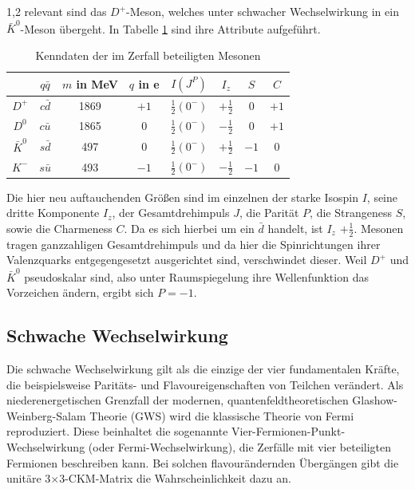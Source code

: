 \documentclass[11pt,a4paper,twoside]{report}
\begin{document}
\begin{spacing}{1,2}
relevant sind das $D^+$-Meson, welches unter schwacher Wechselwirkung in ein $\bar K^0$-Meson übergeht. In Tabelle \ref{tab_DKMeson} sind ihre Attribute
aufgeführt.
\begin{table}[H]
\begin{tabular}{c|ccc|cccc} \toprule 
  & $q\bar q$ &  $m$ in MeV & $q$ in e & $I(J^P)$ & $I_z$ & $S$ & $C$\\
 \midrule
  $D^+$ & $c\bar d$ & 1869 & $+1$ & $\frac12(0^-)$ & $+\frac12$ & 0 & $+1$\\
  $D^0$ & $c\bar u$ & 1865 & $0$  & $\frac12(0^-)$ & $-\frac12$ & 0 & $+1$\\
  $\bar K^0$ & $s\bar d$ & 497 & $0$ & $\frac12(0^-)$ & $+\frac12$ & $-1$& 0\\
  $K^-$ & $s\bar u $ & 493 & $-1$ & $\frac12(0^-)$ & $-\frac12$ & $-1$ & 0
\\\bottomrule \bottomrule
 \end{tabular}
\caption{Kenndaten der im Zerfall beteiligten Mesonen}
\label{tab_DKMeson}
\end{table}
\noindent
Die hier neu auftauchenden Größen sind im einzelnen der starke Isospin $I$, seine dritte Komponente $I_z$, der Gesamtdrehimpuls $J$, die Parität $P$, die
Strangeness $S$, sowie die Charmeness $C$. Da es sich hierbei um ein 
$\bar d$ handelt, ist $I_z$ $+\frac12$. Mesonen tragen ganzzahligen Gesamtdrehimpuls und da hier die Spinrichtungen ihrer Valenzquarks entgegengesetzt 
ausgerichtet sind, verschwindet dieser. Weil $D^+$ und $\bar K^0$ pseudoskalar sind, also unter Raumspiegelung ihre Wellenfunktion das Vorzeichen ändern, 
ergibt sich $P=-1$.

\subsection{Schwache Wechselwirkung}
\label{sec_schwacheWW}
Die schwache Wechselwirkung gilt als die einzige der vier fundamentalen Kräfte, die beispielsweise Paritäts- und Flavoureigenschaften von Teilchen verändert.
Als niederenergetischen Grenzfall der modernen, quantenfeldtheoretischen Glashow-Weinberg-Salam Theorie (GWS) wird die klassische Theorie von Fermi 
reproduziert. Diese beinhaltet die
sogenannte Vier-Fermionen-Punkt-Wechselwirkung (oder Fermi-Wechselwirkung), die Zerfälle mit vier beteiligten Fermionen beschreiben kann. Bei solchen
flavourändernden Übergängen gibt die unitäre 3$\times$3-CKM-Matrix die Wahrscheinlichkeit dazu an. 


\end{spacing}
\end{document}
